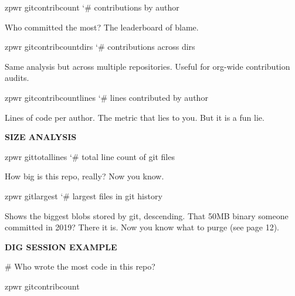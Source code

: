 \documentclass[11pt,a4paper,twoside]{book}
\begin{document}
\begin{codebox}
\color{neongreen}zpwr gitcontribcount       {\char`\#} contributions by author\\
\end{codebox}

Who committed the most? The leaderboard of blame.

\begin{codebox}
\color{neongreen}zpwr gitcontribcountdirs   {\char`\#} contributions across dirs\\
\end{codebox}

Same analysis but across multiple repositories. Useful for org-wide contribution audits.

\begin{codebox}
\color{neongreen}zpwr gitcontribcountlines  {\char`\#} lines contributed by author\\
\end{codebox}

Lines of code per author. The metric that lies to you. But it is a fun lie.


\vspace{12pt}
{\bfseries\color{neonyellow} SIZE ANALYSIS}\vspace{4pt}

\begin{codebox}
\color{neongreen}zpwr gittotallines         {\char`\#} total line count of git files\\
\end{codebox}

How big is this repo, really? Now you know.

\begin{codebox}
\color{neongreen}zpwr gitlargest            {\char`\#} largest files in git history\\
\end{codebox}

Shows the biggest blobs stored by git, descending. That 50MB binary someone committed in 2019? There it is. Now you know what to purge (see page 12).


\vspace{12pt}
{\bfseries\color{neonyellow} DIG SESSION EXAMPLE}\vspace{4pt}

\# Who wrote the most code in this repo?

\begin{codebox}
\color{neongreen}zpwr gitcontribcount\\
\end{codebox}
\end{document}
